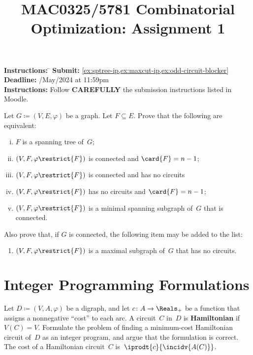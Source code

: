 \documentclass[11pt,leqno,final]{amsart}
\title{MAC0325/5781 Combinatorial Optimization: Assignment 1}
\begin{document}
\maketitle

\begin{tabbing}
  \textbf{Instructions:} \= \kill
  \textbf{Submit:} \> \cref{ex:sptree-ip,ex:maxcut-ip,ex:odd-circuit-blocker}
  \\
  \textbf{Deadline:} /May/2024 at 11:59pm
  \\
  \textbf{Instructions:} \> Follow \textbf{CAREFULLY} the submission
  instructions listed in Moodle.
\end{tabbing}

\begin{exercise}
  Let \(G \coloneqq (V,E,\varphi)\) be a graph.
  Let \(F \subseteq E\).
  Prove that the following are equivalent:
  \begin{enumerate}[(i)]
  \item \(F\) is a spanning tree of~\(G\);
  \item \((V,F,\varphi\restrict{F})\) is connected and \(\card{F} = n-1\);
  \item \((V,F,\varphi\restrict{F})\) is connected and has no circuits
  \item \((V,F,\varphi\restrict{F})\) has no circuits and \(\card{F} = n-1\);
  \item \((V,F,\varphi\restrict{F})\) is a minimal spanning subgraph
    of~\(G\) that is connected.
  \end{enumerate}
  Also prove that, if \(G\) is connected, the following item may be
  added to the list:
  \begin{enumerate}[resume*]
  \item \((V,F,\varphi\restrict{F})\) is a maximal subgraph of~\(G\)
    that has no circuits.
  \end{enumerate}
\end{exercise}

\section{Integer Programming Formulations}

\begin{exercise}
  \label{ex:atsp}
  Let \(D \coloneqq (V,A,\varphi)\) be a digraph, and let
  \(c \colon A \to \Reals_+\) be a function that assigns a nonnegative
  ``cost'' to each arc.
  A circuit~\(C\) in~\(D\) is \textbf{Hamiltonian} if~\(V(C) = V\).
  Formulate the problem of finding a minimum-cost Hamiltonian circuit
  of~\(D\) as an integer program, and argue that the formulation is
  correct.
  The cost of a Hamiltonian circuit~\(C\)
  is~\(\iprodt{c}{\incidv{A(C)}}\).
\end{exercise}
\end{document}

